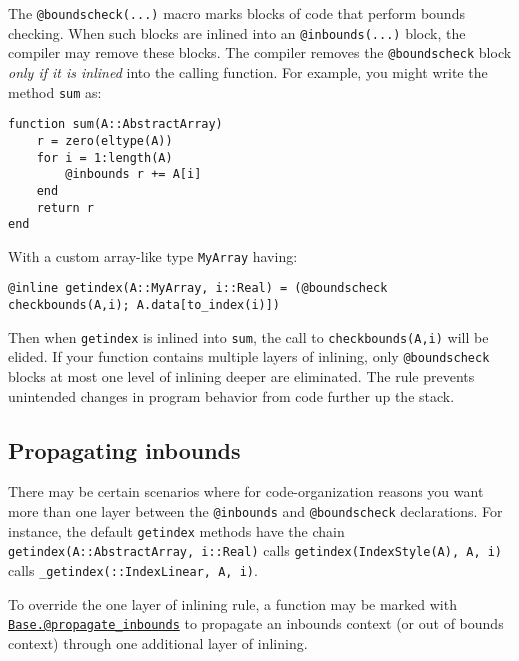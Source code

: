 The \texttt{@boundscheck(...)} macro marks blocks of code that perform bounds checking. When such blocks are inlined into an \texttt{@inbounds(...)} block, the compiler may remove these blocks. The compiler removes the \texttt{@boundscheck} block \emph{only if it is inlined} into the calling function. For example, you might write the method \texttt{sum} as:




\begin{verbatim}
function sum(A::AbstractArray)
    r = zero(eltype(A))
    for i = 1:length(A)
        @inbounds r += A[i]
    end
    return r
end
\end{verbatim}



With a custom array-like type \texttt{MyArray} having:




\begin{verbatim}
@inline getindex(A::MyArray, i::Real) = (@boundscheck checkbounds(A,i); A.data[to_index(i)])
\end{verbatim}



Then when \texttt{getindex} is inlined into \texttt{sum}, the call to \texttt{checkbounds(A,i)} will be elided. If your function contains multiple layers of inlining, only \texttt{@boundscheck} blocks at most one level of inlining deeper are eliminated. The rule prevents unintended changes in program behavior from code further up the stack.



\hypertarget{10208484018202603417}{}


\subsection{Propagating inbounds}



There may be certain scenarios where for code-organization reasons you want more than one layer between the \texttt{@inbounds} and \texttt{@boundscheck} declarations. For instance, the default \texttt{getindex} methods have the chain \texttt{getindex(A::AbstractArray, i::Real)} calls \texttt{getindex(IndexStyle(A), A, i)} calls \texttt{\_getindex(::IndexLinear, A, i)}.



To override the {\textquotedbl}one layer of inlining{\textquotedbl} rule, a function may be marked with \hyperlink{4942611866585954207}{\texttt{Base.@propagate\_inbounds}} to propagate an inbounds context (or out of bounds context) through one additional layer of inlining.



